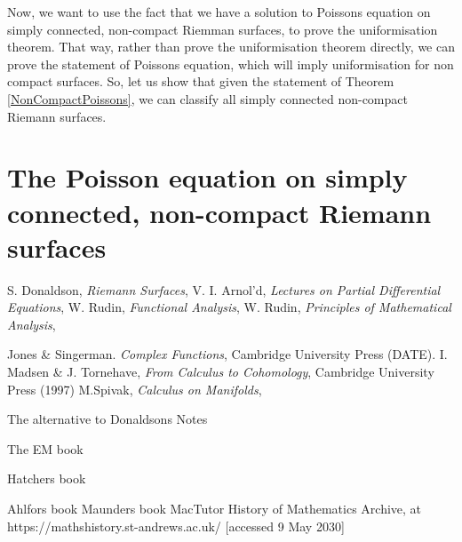 \documentclass[11pt]{report}
\theoremstyle{definition}
\begin{document}
Now, we want to use the fact that we have a solution to Poissons equation on simply connected, non-compact Riemman surfaces, to prove the uniformisation theorem. That way, rather than prove the uniformisation theorem directly, we can prove the statement of Poissons equation, which will imply uniformisation for non compact surfaces. So, let us show that given the statement of Theorem \ref{NonCompactPoissons}, we can classify all simply connected non-compact Riemann surfaces.

\section{The Poisson equation on simply connected, non-compact Riemann surfaces}

%
\begin{thebibliography}{99}
 S. Donaldson, {\em Riemann Surfaces},
 V. I. Arnol'd, {\em Lectures on Partial Differential Equations},
 W. Rudin, {\em Functional Analysis},
 W. Rudin, {\em Principles of Mathematical Analysis}, 

 Jones \& Singerman. {\em Complex Functions}, Cambridge University Press (DATE).
 I. Madsen \& J. Tornehave, {\em From Calculus to Cohomology}, Cambridge University Press (1997)
 M.Spivak, {\em Calculus on Manifolds}, 

 The alternative to Donaldsons Notes

 The EM book

 Hatchers book

 Ahlfors book
 Maunders book
%
 MacTutor History of Mathematics Archive, at https://mathshistory.st-andrews.ac.uk/ [accessed 9 May 2030]


\end{thebibliography}
\end{document}

